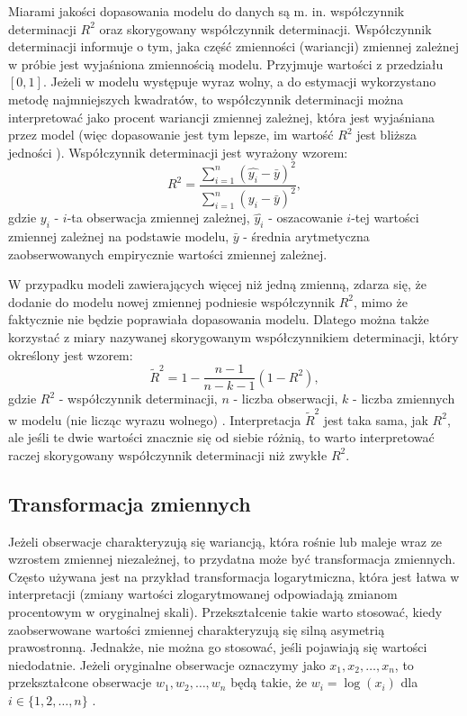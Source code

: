 \documentclass[12pt]{mwbk}
\theoremstyle{plain}
\theoremstyle{definition}
\theoremstyle{remark}
\begin{document}
Miarami jakości dopasowania modelu do danych są m. in. współczynnik determinacji $R^2$ oraz skorygowany współczynnik determinacji. Współczynnik determinacji informuje o tym, jaka część zmienności (wariancji) zmiennej zależnej w próbie jest wyjaśniona zmiennością modelu. Przyjmuje wartości z przedziału $[0,1]$. Jeżeli w modelu występuje wyraz wolny, a do estymacji wykorzystano metodę najmniejszych kwadratów, to współczynnik determinacji można interpretować jako procent wariancji zmiennej zależnej, która jest wyjaśniana przez model (więc dopasowanie jest tym lepsze, im wartość $R^2$ jest bliższa jedności \cite{r2}). Współczynnik determinacji jest wyrażony wzorem:
$$R^2=\frac{\sum\limits_{i=1}^{n}(\hat{y_i}-\bar{y})^2}{\sum\limits_{i=1}^{n}(y_i-\bar{y})^2},$$ gdzie $y_i$ - $i$-ta obserwacja zmiennej zależnej, $\hat{y_i}$ - oszacowanie $i$-tej wartości zmiennej zależnej na podstawie modelu, $\bar{y}$ - średnia arytmetyczna zaobserwowanych empirycznie wartości zmiennej zależnej.

W przypadku modeli zawierających więcej niż jedną zmienną, zdarza się, że dodanie do modelu nowej zmiennej podniesie współczynnik $R^2$, mimo że faktycznie nie będzie poprawiała dopasowania modelu. Dlatego można także korzystać z miary nazywanej skorygowanym współczynnikiem determinacji, który określony jest wzorem:
$$\tilde{R}^2=1-\frac{n-1}{n-k-1}(1-R^2),$$
gdzie $R^2$ - współczynnik determinacji, $n$ - liczba obserwacji, $k$ - liczba zmiennych w modelu (nie licząc wyrazu wolnego) \cite{skorygowany}. Interpretacja $\tilde{R}^2$ jest taka sama, jak $R^2$, ale jeśli te dwie wartości znacznie się od siebie różnią, to warto interpretować raczej skorygowany współczynnik determinacji niż zwykłe $R^2$.

\subsection{Transformacja zmiennych}

Jeżeli obserwacje charakteryzują się wariancją, która rośnie lub maleje wraz ze wzrostem zmiennej niezależnej, to przydatna może być transformacja zmiennych. Często używana jest na przykład transformacja logarytmiczna, która jest łatwa w interpretacji (zmiany wartości zlogarytmowanej odpowiadają zmianom procentowym w oryginalnej skali). Przekształcenie takie warto stosować, kiedy zaobserwowane wartości zmiennej charakteryzują się silną asymetrią prawostronną. Jednakże, nie można go stosować, jeśli pojawiają się wartości niedodatnie. Jeżeli oryginalne obserwacje oznaczymy jako $x_1, x_2,\ldots, x_n$, to przekształcone obserwacje $w_1, w_2,\ldots,w_n$ będą takie, że $w_i=\log(x_i)$ dla $i \in \lbrace{1,2,\ldots,n\rbrace}$ \cite{forecasting}.
\end{document}
